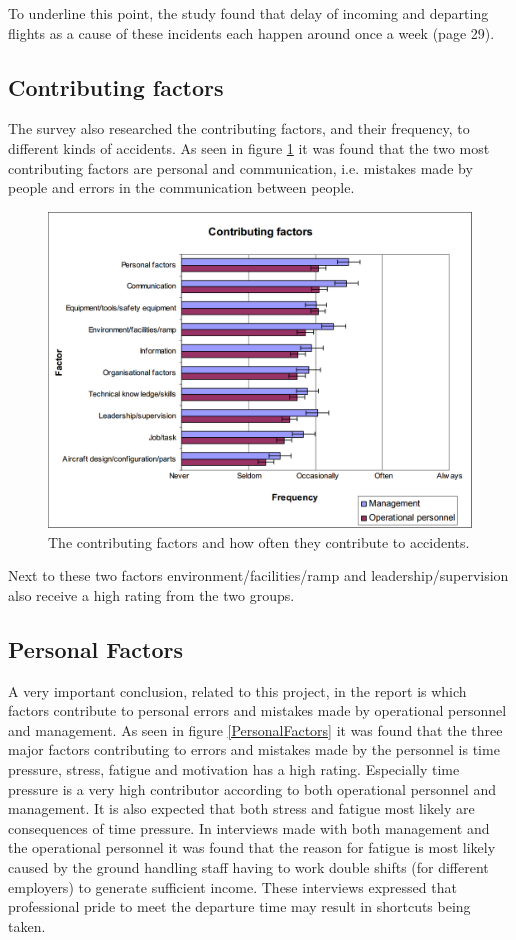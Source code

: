 To underline this point, the study found that delay of incoming and departing flights as a cause of these incidents each happen around once a week (page 29).

\subsection{Contributing factors} %
The survey also researched the contributing factors, and their frequency, to different kinds of accidents. As seen in figure \ref{ContributingFactors} it was found that the two most contributing factors are personal and communication, i.e. mistakes made by people and errors in the communication between people.

\begin{figure}[H]
\centering
\includegraphics[width=\textwidth]{Grafik/ContributingFactors}
\caption{The contributing factors and how often they contribute to accidents.}
\label{ContributingFactors}
\end{figure}

Next to these two factors environment/facilities/ramp and leadership/supervision also receive a high rating from the two groups.

\newpage
\subsection{Personal Factors} %
A very important conclusion, related to this project, in the report is which factors contribute to personal errors and mistakes made by operational personnel and management. As seen in figure \ref{PersonalFactors} it was found that the three major factors contributing to errors and mistakes made by the personnel is time pressure, stress, fatigue and motivation has a high rating. Especially time pressure is a very high contributor according to both operational personnel and management. It is also expected that both stress and fatigue most likely are consequences of time pressure. In interviews made with both management and the operational personnel it was found that the reason for fatigue is most likely caused by the ground handling staff having to work double shifts (for different employers) to generate sufficient income. These interviews expressed that professional pride to meet the departure time may result in shortcuts being taken.

